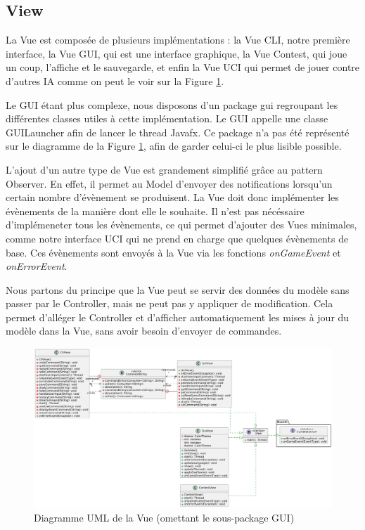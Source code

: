 \documentclass{article}
\begin{document}
\subsection{View}
La Vue est composée de plusieurs implémentations : la Vue CLI, notre première interface, la Vue GUI, qui est une interface graphique, la Vue Contest, qui joue un coup, l'affiche et le sauvegarde,
et enfin la Vue UCI qui permet de jouer contre d'autres IA comme on peut le voir sur la Figure \ref{umlView}.

Le GUI étant plus complexe, nous disposons d'un package gui regroupant les différentes classes utiles à cette implémentation. Le GUI appelle une classe GUILauncher afin de lancer
le thread Javafx. Ce package n'a pas été représenté sur le diagramme de la Figure \ref{umlView}, afin de garder celui-ci le plus lisible possible.

L'ajout d'un autre type de Vue est grandement simplifié grâce au pattern Observer. En effet, il permet au Model d'envoyer des notifications lorsqu'un certain nombre d'évènement
se produisent. La Vue doit donc implémenter les évènements de la manière dont elle le souhaite. Il n'est pas nécéssaire d'implémeneter tous les évènements, ce qui permet d'ajouter des Vues minimales,
comme notre interface UCI qui ne prend en charge que quelques évènements de base. Ces évènements sont envoyés à la Vue via les fonctions \textit{onGameEvent} et \textit{onErrorEvent}.

Nous partons du principe que la Vue peut se servir des données du modèle sans passer par le Controller, mais ne peut pas y appliquer de modification. Cela permet d'alléger le Controller
et d'afficher automatiquement les mises à jour du modèle dans la Vue, sans avoir besoin d'envoyer de commandes.

\begin{figure}[h]
    \centering
    \includegraphics[width=\textwidth]{uml_view}
    \caption{Diagramme UML de la Vue (omettant le sous-package GUI)}
    \label{umlView}
\end{figure}
\FloatBarrier
\end{document}
